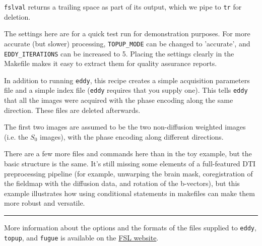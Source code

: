 \texttt{fslval} returns a trailing space as part of its output, which we pipe to \texttt{tr} for deletion.

The settings here are for a quick test run for demonstration
purposes. For more accurate (but slower) processing,
\texttt{TOPUP_MODE} can be changed to 'accurate', and
\texttt{EDDY_ITERATIONS} can be increased to 5. Placing the settings
clearly in the Makefile makes it easy to extract them for quality
assurance reports. 

In addition to running \texttt{eddy}, this recipe creates a simple acquisition parameters file and a simple index file (\texttt{eddy} requires that you supply one). This tells \texttt{eddy} that all the images were acquired with the phase encoding along the same direction. These files are deleted afterwards.

The first two images are assumed to be the two non-diffusion weighted images (i.e. the $S _{0}$ images), with the phase encoding along different directions.


There are a few more files and commands here than in the toy example,
but the basic structure is the same. It's still missing some elements
of a full-featured DTI preprocessing pipeline (for example, unwarping
the brain mask, coregistration of the fieldmap with the diffusion
data, and rotation of the b-vectors), but this example illustrates how
using conditional statements in makefiles can make them more robust
and versatile.

\vspace{\baselineskip}
\hrule
\vspace{\baselineskip}

More information about the options and the formats of the files
supplied to \texttt{eddy}, \texttt{topup}, and \texttt{fugue} is
available on the
\href{http://fsl.fmrib.ox.ac.uk/fsl/fslwiki/FslOverview}{FSL website}.





